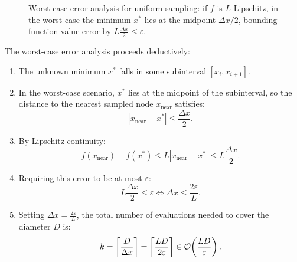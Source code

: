 \begin{figure}[H]
\caption{Worst-case error analysis for uniform sampling: if $f$ is $L$-Lipschitz, in the worst case the minimum $x^*$ lies at the midpoint $\Delta x / 2$, bounding function value error by $L \frac{\Delta x}{2} \le \varepsilon$.}
\label{fig:lipschitz-grid-worst-case-en}
\end{figure}

The worst-case error analysis proceeds deductively:
\begin{enumerate}
    \item The unknown minimum $x^*$ falls in some subinterval $[x_i, x_{i+1}]$.
    \item In the worst-case scenario, $x^*$ lies at the midpoint of the subinterval, so the distance to the nearest sampled node $x_{\text{near}}$ satisfies:
    \begin{equation}
        |x_{\text{near}} - x^*| \le \frac{\Delta x}{2}.
    \end{equation}
    \item By Lipschitz continuity:
    \begin{equation}
        f(x_{\text{near}}) - f(x^*) \le L |x_{\text{near}} - x^*| \le L \frac{\Delta x}{2}.
    \end{equation}
    \item Requiring this error to be at most $\varepsilon$:
    \begin{equation}
        L \frac{\Delta x}{2} \le \varepsilon \iff \Delta x \le \frac{2\varepsilon}{L}.
    \end{equation}
    \item Setting $\Delta x = \frac{2\varepsilon}{L}$, the total number of evaluations needed to cover the diameter $D$ is:
    \begin{equation}
        k = \left\lceil \frac{D}{\Delta x} \right\rceil = \left\lceil \frac{LD}{2\varepsilon} \right\rceil \in \mathcal{O}\!\left(\frac{LD}{\varepsilon}\right).
        \label{eq:complexity-lipschitz-global-en}
    \end{equation}
\end{enumerate}

